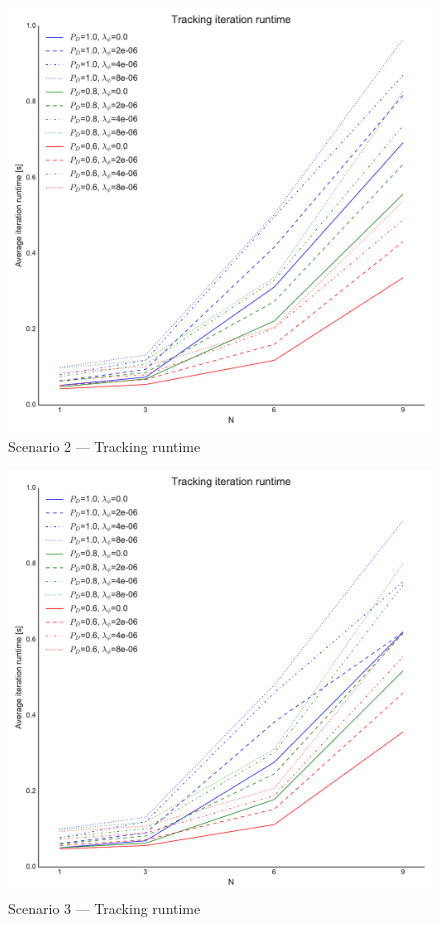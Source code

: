 {\begin{figure}
\includegraphics[height = .46\textheight]{Figures/plots/Scenario2_Tracking-Runtime.pdf}
\caption{Scenario 2 --- Tracking runtime}\label{fig:scenario2_tracking_runtime}
\end{figure}

\begin{figure}
\centering
\includegraphics[height = .46\textheight]{Figures/plots/Scenario3_Tracking-Runtime.pdf}
\caption{Scenario 3 --- Tracking runtime}\label{fig:scenario3_tracking_runtime}


\end{figure}}
